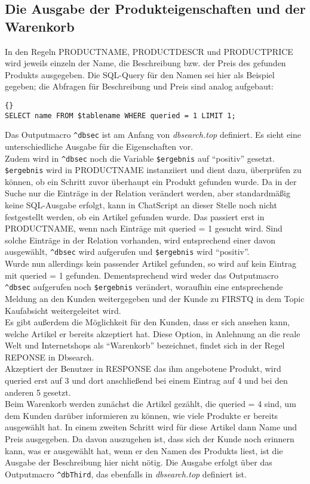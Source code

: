 \subsection{Die Ausgabe der Produkteigenschaften und der Warenkorb}
\label{sec:AusgabeWarenkorb}

In den Regeln PRODUCTNAME, PRODUCTDESCR und PRODUCTPRICE wird jeweils einzeln der Name, die Beschreibung bzw. der Preis des gefunden Produkts ausgegeben. Die SQL-Query für den Namen sei hier als Beispiel gegeben; die Abfragen für Beschreibung und Preis sind analog aufgebaut:
\begin{lstlisting}{}
SELECT name FROM $tablename WHERE queried = 1 LIMIT 1;
\end{lstlisting}
Das Outputmacro \lstinline|^dbsec| ist am Anfang von \textit{dbsearch.top} definiert. Es sieht eine unterschiedliche Ausgabe für die Eigenschaften vor.\\
Zudem wird in \lstinline|^dbsec| noch die Variable \lstinline|$ergebnis| auf "`positiv"' gesetzt. \lstinline|$ergebnis| wird in PRODUCTNAME instanziiert und dient dazu, überprüfen zu können, ob ein Schritt zuvor überhaupt ein Produkt gefunden wurde. Da in der Suche nur die Einträge in der Relation verändert werden, aber standardmäßig keine SQL-Ausgabe erfolgt, kann in ChatScript an dieser Stelle noch nicht festgestellt werden, ob ein Artikel gefunden wurde. Das passiert erst in PRODUCTNAME, wenn nach Einträge mit queried = 1 gesucht wird. Sind solche Einträge in der Relation vorhanden, wird entsprechend einer davon ausgewählt, \lstinline|^dbsec| wird aufgerufen und \lstinline|$ergebnis| wird "`positiv"'.\\
Wurde nun allerdings kein passender Artikel gefunden, so wird auf kein Eintrag mit queried = 1 gefunden. Dementsprechend wird weder das Outputmacro \lstinline|^dbsec| aufgerufen noch \lstinline|$ergebnis| verändert, woraufhin eine entsprechende Meldung an den Kunden weitergegeben und der Kunde zu FIRSTQ in dem Topic Kaufabsicht weitergeleitet wird.\\
Es gibt außerdem die Möglichkeit für den Kunden, dass er sich ansehen kann, welche Artikel er bereits akzeptiert hat. Diese Option, in Anlehnung an die reale Welt und Internetshops als "`Warenkorb"' bezeichnet, findet sich in der Regel REPONSE in Dbsearch.\\
Akzeptiert der Benutzer in RESPONSE das ihm angebotene Produkt, wird queried erst auf 3 und dort anschließend bei einem Eintrag auf 4 und bei den anderen 5 gesetzt.\\
Beim Warenkorb werden zunächst die Artikel gezählt, die queried = 4 sind, um dem Kunden darüber informieren zu können, wie viele Produkte er bereits ausgewählt hat. In einem zweiten Schritt wird für diese Artikel dann Name und Preis ausgegeben. Da davon auszugehen ist, dass sich der Kunde noch erinnern kann, was er ausgewählt hat, wenn er den Namen des Produkts liest, ist die Ausgabe der Beschreibung hier nicht nötig. Die Ausgabe erfolgt über das Outputmacro \lstinline|^dbThird|, das ebenfalls in \textit{dbsearch.top} definiert ist.


